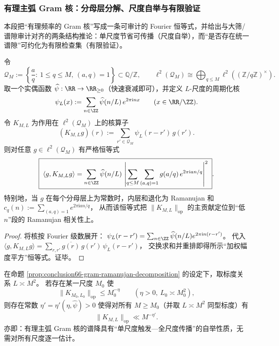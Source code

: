 \subsubsection{有理主弧 Gram 核：分母层分解、尺度自举与有限验证}\label{subsubsec:unit-circle-rational-gram-bootstrap}

本段把“有理频率的 Gram 核”写成一条可审计的 Fourier 恒等式，并给出与大筛/谱隙审计对齐的两条结构推论：单尺度节省可传播（尺度自举），而“是否存在统一谱隙”可约化为有限检查集（有限验证）。

\begin{proposition}\label{prop:conclusion66-gram-ramanujan-decomposition}
令
\[
\mathcal{Q}_M:=\left\{\frac{a}{q}:\ 1\le q\le M,\ (a,q)=1\right\}\subset\mathbb{Q}/\mathbb{Z},
\qquad
\ell^2(\mathcal{Q}_M)\cong\bigoplus_{q\le M}\ell^2((\mathbb{Z}/q\mathbb{Z})^\times).
\]
取一个实偶函数 \(\widehat\psi:\RR\to\RR_{\ge 0}\)（快速衰减即可），并定义 \(L\)-尺度的周期化核
\[
\psi_L(x):=\sum_{n\in\ZZ}\widehat\psi(n/L)\,e^{2\pi\mathrm{i}nx}\qquad(x\in\RR/\ZZ).
\]
令 \(K_{M,L}\) 为作用在 \(\ell^2(\mathcal{Q}_M)\) 上的核算子
\[
(K_{M,L}g)(r):=\sum_{r'\in\mathcal{Q}_M}\psi_L(r-r')\,g(r').
\]
则对任意 \(g\in\ell^2(\mathcal{Q}_M)\) 有严格恒等式
\[
\boxed{\;
\langle g,K_{M,L}g\rangle
=\sum_{n\in\ZZ}\widehat\psi(n/L)\,
\left|\sum_{q\le M}\sum_{\substack{(a,q)=1}} g(a/q)\,e^{2\pi\mathrm{i}an/q}\right|^2\; }.
\]
特别地，当 \(g\) 在每个分母层上为常数时，内层和退化为 Ramanujan 和
\(
c_q(n):=\sum_{(a,q)=1}e^{2\pi\mathrm{i}an/q}
\)，
从而该恒等式把 \(\|K_{M,L}\|_{\mathrm{op}}\) 的主贡献定位到“低 \(n\)”段的 Ramanujan 相关性上。
\end{proposition}

\begin{proof}
将核按 Fourier 级数展开：
\(
\psi_L(r-r')=\sum_{n\in\ZZ}\widehat\psi(n/L)e^{2\pi\mathrm{i}n(r-r')}
\)。
代入
\(
\langle g,K_{M,L}g\rangle=\sum_{r,r'}\overline{g(r)}\,g(r')\,\psi_L(r-r')
\)，
交换求和并重排即得所示“加权幅度平方”恒等式。证毕。
\end{proof}

\begin{theorem}\label{thm:conclusion67-scale-bootstrap}
在命题 \ref{prop:conclusion66-gram-ramanujan-decomposition} 的设定下，取标度关系 \(L\asymp M^{2}\)。
若存在某一尺度 \(M_0\) 使
\[
\|K_{M_0,L_0}\|_{\mathrm{op}}\le M_0^{-\eta}\qquad(\eta>0,\ L_0\asymp M_0^2),
\]
则存在常数 \(\eta'=\eta'(\eta,\widehat\psi)>0\) 使得对所有 \(M\ge M_0\)（并取 \(L\asymp M^2\) 同型标度）有
\[
\boxed{\;
\|K_{M,L}\|_{\mathrm{op}}\ll M^{-\eta'}.\;}
\]
亦即：有理主弧 Gram 核的谱降具有“单尺度触发—全尺度传播”的自举性质，无需对所有尺度逐一估计。
\end{theorem}

